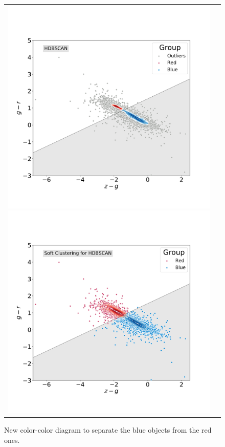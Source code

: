 \documentclass[fleqn,usenatbib]{mnras}
\begin{document}
\begin{figure}
\centering
\begin{tabular}{l l}
  \includegraphics[width=0.5\linewidth, trim=10 10 5 8, clip]{Figs/blued-red-hdbscan.pdf}
   \includegraphics[width=0.5\linewidth, trim=10 10 5 8. clip]{Figs/blue-red-hdbscan-soft-alternative.pdf}
  \end{tabular}  
  \caption{New color-color diagram to separate the blue objects from the red ones.}
\label{fig:hdbscan}
\end{figure}
\end{document}

